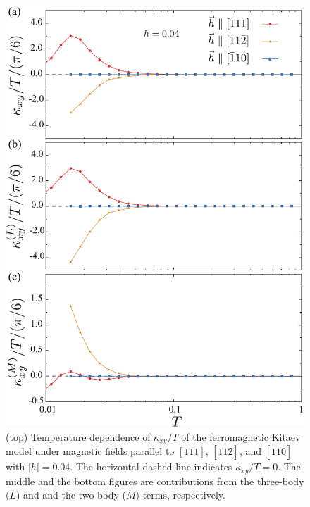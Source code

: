 \documentclass[reprint,amsmath,amssymb,aps,prx]{revtex4-2}
\begin{document}
\begin{figure}
  \begin{center}
    \includegraphics[width=0.9\linewidth]{Figs/plot_k_all_h0.04_ab.pdf}
  \end{center}
  \caption{(top) Temperature dependence of $\kappa_{xy}/T$ of the ferromagnetic Kitaev model under magnetic fields parallel to $[111]$, $[11\bar{2}]$, and $[\bar{1}10]$ with $|h|=0.04$. The horizontal dashed line indicates $\kappa_{xy}/T = 0$. The middle and the bottom figures are contributions from the three-body ($L$) and and the two-body ($M$) terms, respectively.}
  \label{fig:k_all_h0.04_ab}
\end{figure}
\end{document}
